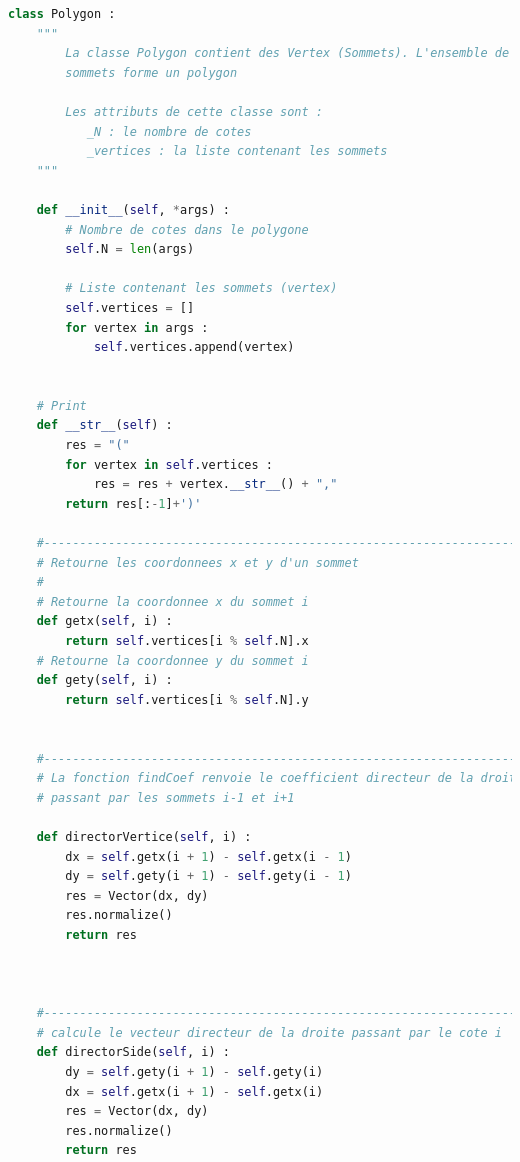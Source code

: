 \documentclass[a4paper,reqno]{article}
\begin{document}

\begin{lstlisting}[language=Python,frame=single,caption=Création de la classe Polygon]
class Polygon : 
    """
        La classe Polygon contient des Vertex (Sommets). L'ensemble de ces 
        sommets forme un polygon 
        
        Les attributs de cette classe sont : 
           _N : le nombre de cotes 
           _vertices : la liste contenant les sommets
    """
    
    def __init__(self, *args) : 
        # Nombre de cotes dans le polygone
        self.N = len(args)                                   
        
        # Liste contenant les sommets (vertex)
        self.vertices = []                                    
        for vertex in args : 
            self.vertices.append(vertex)         
            
            
    # Print
    def __str__(self) : 
        res = "(" 
        for vertex in self.vertices : 
            res = res + vertex.__str__() + ","
        return res[:-1]+')'
    
    #----------------------------------------------------------------------  
    # Retourne les coordonnees x et y d'un sommet 
    #
    # Retourne la coordonnee x du sommet i 
    def getx(self, i) : 
        return self.vertices[i % self.N].x 
    # Retourne la coordonnee y du sommet i 
    def gety(self, i) : 
        return self.vertices[i % self.N].y 
    
    
    #---------------------------------------------------------------------
    # La fonction findCoef renvoie le coefficient directeur de la droite 
    # passant par les sommets i-1 et i+1 
    
    def directorVertice(self, i) : 
        dx = self.getx(i + 1) - self.getx(i - 1)
        dy = self.gety(i + 1) - self.gety(i - 1) 
        res = Vector(dx, dy)
        res.normalize()
        return res 
        
    
    
    #----------------------------------------------------------------------   
    # calcule le vecteur directeur de la droite passant par le cote i 
    def directorSide(self, i) : 
        dy = self.gety(i + 1) - self.gety(i)
        dx = self.getx(i + 1) - self.getx(i)
        res = Vector(dx, dy)
        res.normalize() 
        return res 
          
    




\end{lstlisting}
\end{document}

